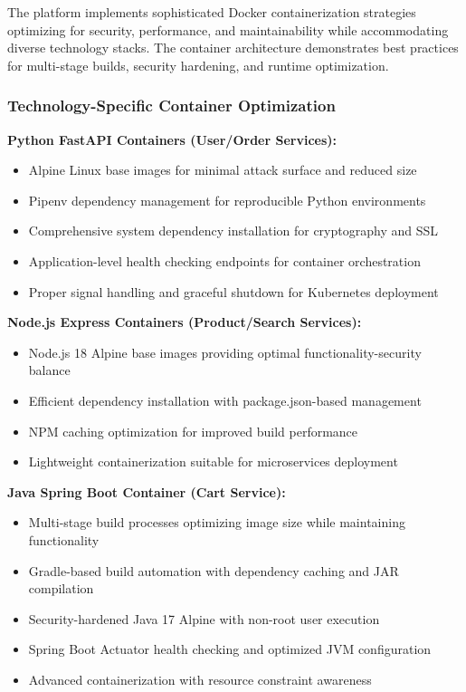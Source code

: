 The platform implements sophisticated Docker containerization strategies optimizing for security, performance, and maintainability while accommodating diverse technology stacks. The container architecture demonstrates best practices for multi-stage builds, security hardening, and runtime optimization.

\subsubsection{Technology-Specific Container Optimization}

\textbf{Python FastAPI Containers (User/Order Services):}
\begin{itemize}
\item Alpine Linux base images for minimal attack surface and reduced size
\item Pipenv dependency management for reproducible Python environments
\item Comprehensive system dependency installation for cryptography and SSL
\item Application-level health checking endpoints for container orchestration
\item Proper signal handling and graceful shutdown for Kubernetes deployment
\end{itemize}

\textbf{Node.js Express Containers (Product/Search Services):}
\begin{itemize}
\item Node.js 18 Alpine base images providing optimal functionality-security balance
\item Efficient dependency installation with package.json-based management
\item NPM caching optimization for improved build performance
\item Lightweight containerization suitable for microservices deployment
\end{itemize}

\textbf{Java Spring Boot Container (Cart Service):}
\begin{itemize}
\item Multi-stage build processes optimizing image size while maintaining functionality
\item Gradle-based build automation with dependency caching and JAR compilation
\item Security-hardened Java 17 Alpine with non-root user execution
\item Spring Boot Actuator health checking and optimized JVM configuration
\item Advanced containerization with resource constraint awareness
\end{itemize}

